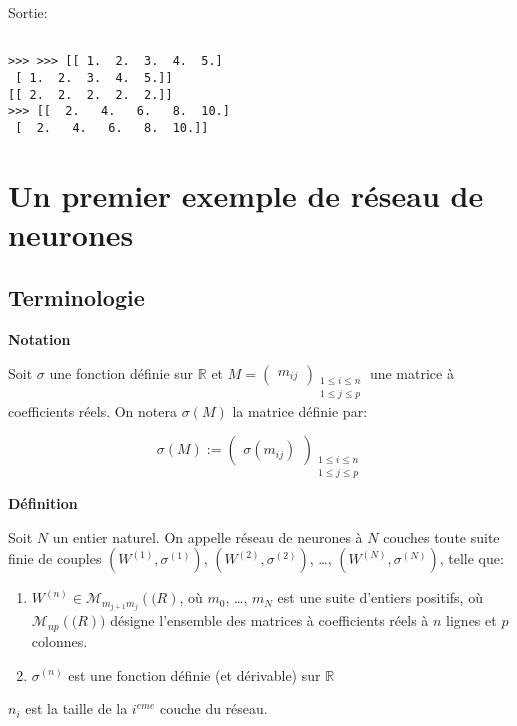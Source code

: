 \documentclass[11pt]{article}
\begin{document}
Sortie:

\begin{verbatim}

>>> >>> [[ 1.  2.  3.  4.  5.]
 [ 1.  2.  3.  4.  5.]]
[[ 2.  2.  2.  2.  2.]]
>>> [[  2.   4.   6.   8.  10.]
 [  2.   4.   6.   8.  10.]]
\end{verbatim}


\section{Un premier exemple de réseau de neurones}
\label{sec-2}

\subsection{Terminologie}
\label{sec-2-1}

\textbf{Notation}

Soit $\sigma$ une fonction définie sur $\mathbb{R}$ et
$M=\begin{pmatrix}m_{ij}
\end{pmatrix}_{\substack{1\leq i\leq n\\1\leq j\leq p }}$ une matrice à
coefficients réels. On notera $\sigma(M)$ la matrice définie par:

\begin{equation}
\sigma(M):=\begin{pmatrix}
\sigma(m_{ij})
\end{pmatrix}_{\substack{1\leq i\leq n\\1\leq j\leq p }}
\end{equation}

\textbf{Définition}

Soit $N$ un entier naturel. On appelle réseau de neurones à $N$ couches toute
suite finie de couples $(W^{(1)},\sigma^{(1)})$, $(W^{(2)},\sigma^{(2)})$, \ldots{},
$(W^{(N)},\sigma^{(N)})$, telle que:

\begin{enumerate}
\item $W^{(n)}\in\mathcal{M}_{m_{j+1}m_{j}}(\mathbb(R)$, où $m_{0}$, \ldots{}, $m_N$ est
une suite d'entiers positifs, où $\mathcal{M}_{np}(\mathbb(R))$ désigne
l'ensemble des matrices à coefficients réels à $n$ lignes et $p$ colonnes.
\item $\sigma^{(n)}$ est une fonction définie (et dérivable) sur $\mathbb{R}$
\end{enumerate}

$n_{i}$ est la taille de la $i^{eme}$ couche du réseau.
\end{document}
